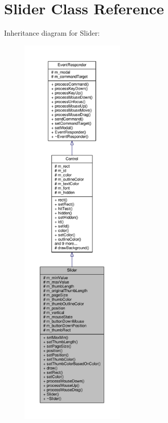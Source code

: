 \hypertarget{classSlider}{}\section{Slider Class Reference}
\label{classSlider}


Inheritance diagram for Slider\+:
\nopagebreak
\begin{figure}[H]
\begin{center}
\leavevmode
\includegraphics[height=550pt]{de/d7c/classSlider__inherit__graph}
\end{center}
\end{figure}


